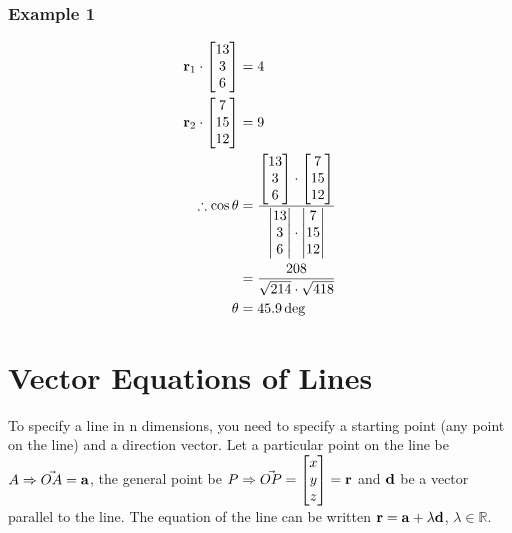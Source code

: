 \documentclass[class=article, crop=false]{standalone}
\begin{document}
\subsubsection*{Example 1}
\begin{align*}
\bold{r}_1 \cdot \begin{bmatrix} 13 \\ 3 \\ 6 \end{bmatrix} & = 4 \\
\bold{r}_2 \cdot \begin{bmatrix} 7 \\ 15 \\ 12 \end{bmatrix} & = 9 \\
\therefore \cos \theta & = \frac{\begin{bmatrix} 13 \\ 3 \\ 6 \end{bmatrix} \cdot \begin{bmatrix} 7 \\ 15 \\ 12 \end{bmatrix}}{\begin{vmatrix} 13 \\ 3 \\ 6 \end{vmatrix} \cdot \begin{vmatrix} 7 \\ 15 \\ 12 \end{vmatrix}} \\
& = \frac{208}{\sqrt{214}\cdot\sqrt{418}} \\
\theta & = 45.9 \deg \\
\end{align*}

\section*{Vector Equations of Lines}
To specify a line in n dimensions, you need to specify a starting point (any point on the line) and a direction vector. Let a particular point on the line be $A \Rightarrow \vec{OA} = \bold{a}$, the general point be $P \Rightarrow \vec{OP} = \begin{bmatrix} x \\ y \\ z \\\end{bmatrix} = \bold{r}$ and $\bold{d}$ be a vector parallel to the line. The equation of the line can be written $\bold{r} = \bold{a} + \lambda \bold{d}$, $\lambda \in \mathbb{R}$. \\
\end{document}
